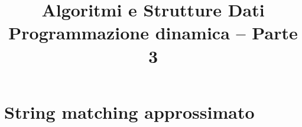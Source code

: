 

\usepackage{epigraph}
\usepackage[normalem]{ulem}
\usepackage{xcolor}
\usepackage{colortbl}
\usepackage{tikz}
\usepackage[normalem]{ulem}
\usepackage[absolute,overlay]{textpos}
\usetikzlibrary{trees}
\usetikzlibrary{shapes}
\usetikzlibrary{positioning}

\setlength{\epigraphwidth}{6cm}

\renewcommand*{\arraystretch}{1.2}
\usepackage{xmpmulti}
\usepackage{listings}


\newcommand*\circled[1]{\tikz[baseline=(char.base)]{
      \node[circle,ball color=blue, shade, 
 color=white,inner sep=1.2pt] (char) {\tiny #1};}}


\title[ASD - Programmazione Dinamica]{\textbf{Algoritmi e Strutture Dati}\\[24pt]Programmazione dinamica -- Parte 3}

\graphicspath{{figs/13/}}





\FrameTitle{}

\FrameContent

\section{String matching approssimato}

